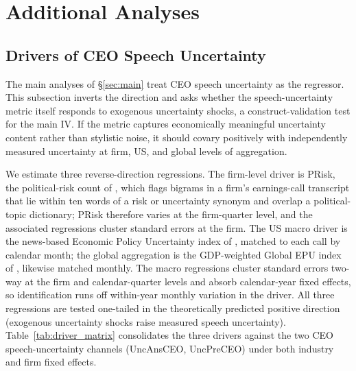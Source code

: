 
\section{Additional Analyses}
\label{sec:additional}

\subsection{Drivers of CEO Speech Uncertainty}
\label{sec:additional:drivers}

The main analyses of \S\ref{sec:main} treat CEO speech uncertainty as the regressor. This subsection inverts the direction and asks whether the speech-uncertainty metric itself responds to exogenous uncertainty shocks, a construct-validation test for the main IV. If the metric captures economically meaningful uncertainty content rather than stylistic noise, it should covary positively with independently measured uncertainty at firm, US, and global levels of aggregation.

We estimate three reverse-direction regressions. The firm-level driver is PRisk, the political-risk count of , which flags bigrams in a firm's earnings-call transcript that lie within ten words of a risk or uncertainty synonym and overlap a political-topic dictionary; PRisk therefore varies at the firm-quarter level, and the associated regressions cluster standard errors at the firm. The US macro driver is the news-based Economic Policy Uncertainty index of , matched to each call by calendar month; the global aggregation is the GDP-weighted Global EPU index of , likewise matched monthly. The macro regressions cluster standard errors two-way at the firm and calendar-quarter levels and absorb calendar-year fixed effects, so identification runs off within-year monthly variation in the driver. All three regressions are tested one-tailed in the theoretically predicted positive direction (exogenous uncertainty shocks raise measured speech uncertainty). Table~\ref{tab:driver_matrix} consolidates the three drivers against the two CEO speech-uncertainty channels (UncAnsCEO, UncPreCEO) under both industry and firm fixed effects.

